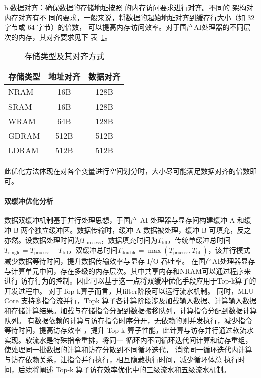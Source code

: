 \begin{figure}[ht]
    \centering
    \caption{}
    \label{fig:bank_conflic}
\end{figure}





b.数据对齐：确保数据的存储地址按照 的内存访问要求进行对齐。不同的 架构对内存对齐有不
同的要求，一般来说，将数据的起始地址对齐到缓存行大小（如 32 字节或 64 字节）的倍数，
可以提高内存访问效率。对于国产AI处理器的不同层次的内存，其对齐要求见下
表~\ref{tab:alignment}。

\begin{table}
    \centering
    \begin{tabular}{lcc}
    \toprule
    存储类型 & 地址对齐 & 数据对齐 \\
    \midrule
    NRAM & 16B & 128B \\
    SRAM & 16B & 128B \\
    WRAM & 64B & 128B \\
    GDRAM & 512B & 512B \\
    LDRAM & 512B & 512B \\
    \bottomrule
    \end{tabular}
    \caption{存储类型及其对齐方式}
    \label{tab:alignment}
    \end{table}
此优化方法体现在对各个变量进行空间划分时，大小尽可能满足数据对齐的倍数即可。


\paragraph{双缓冲优化分析}

数据双缓冲机制基于并行处理思想，于国产 AI 处理器与显存间构建缓冲 A 和缓冲 B 两个独立缓冲区。数据传输时，缓冲 A 数据被处理，缓冲 B 可填充，反之亦然。设数据处理时间为\(T_{\text{process}}\)，数据填充时间为\(T_{\text{fill}}\)，传统单缓冲总时间\(T_{\text{single}} = T_{\text{process}} + T_{\text{fill}}\)，双缓冲总时间\(T_{\text{double}}=\max(T_{\text{process}}, T_{\text{fill}})\)，该并行模式减少数据等待时间，提升数据传输效率与显存 I/O 吞吐率。
在国产AI处理器显存与计算单元中间，存在多级的内存层次。其中共享内存和NRAM可以通过程序来进行
访存行为的控制。因此可以基于这一点将双缓冲优化手段应用于Top-k算子的开发过程中。
对于Top-k算子而言，其filter阶段可以运行流水机制。
同时，MLU Core 支持多指令流并行，Topk 算子各计算阶段涉及加载输入数据、计算输入数据
和存储计算结果。加载与存储指令分配到数据搬移队列，计算指令分配到数据计算队列。
有数据依赖的计算与访存指令时序分开，无依赖的则并发执行，减少指令等待时间，提高访存效率
，提升 Top-k 算子性能，此计算与访存并行通过软流水实现。软流水是特殊指令重排，将同一
循环内不同循环迭代间计算和访存重组，使处理同一批数据的计算和访存分散到不同循环迭代，
消除同一循环迭代内计算与访存依赖关系，让指令并行执行，相互隐藏执行时间，减少循环体总
执行时间，后续将阐述 Top-k 算子访存效率优化中的三级流水和五级流水机制。


